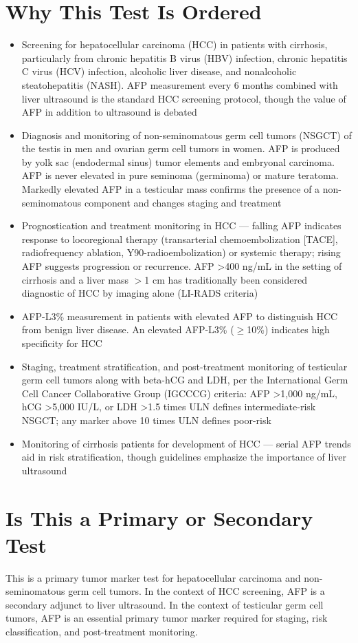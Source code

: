 \section*{Why This Test Is Ordered}
\begin{itemize}
  \item Screening for hepatocellular carcinoma (HCC) in patients with cirrhosis, particularly from chronic hepatitis B virus (HBV) infection, chronic hepatitis C virus (HCV) infection, alcoholic liver disease, and nonalcoholic steatohepatitis (NASH). AFP measurement every 6 months combined with liver ultrasound is the standard HCC screening protocol, though the value of AFP in addition to ultrasound is debated
  \item Diagnosis and monitoring of non-seminomatous germ cell tumors (NSGCT) of the testis in men and ovarian germ cell tumors in women. AFP is produced by yolk sac (endodermal sinus) tumor elements and embryonal carcinoma. AFP is never elevated in pure seminoma (germinoma) or mature teratoma. Markedly elevated AFP in a testicular mass confirms the presence of a non-seminomatous component and changes staging and treatment
  \item Prognostication and treatment monitoring in HCC --- falling AFP indicates response to locoregional therapy (transarterial chemoembolization [TACE], radiofrequency ablation, Y90-radioembolization) or systemic therapy; rising AFP suggests progression or recurrence. AFP >400 ng/mL in the setting of cirrhosis and a liver mass $>$1 cm has traditionally been considered diagnostic of HCC by imaging alone (LI-RADS criteria)
  \item AFP-L3\% measurement in patients with elevated AFP to distinguish HCC from benign liver disease. An elevated AFP-L3\% ($\geq$10\%) indicates high specificity for HCC
  \item Staging, treatment stratification, and post-treatment monitoring of testicular germ cell tumors along with beta-hCG and LDH, per the International Germ Cell Cancer Collaborative Group (IGCCCG) criteria: AFP >1,000 ng/mL, hCG >5,000 IU/L, or LDH >1.5 times ULN defines intermediate-risk NSGCT; any marker above 10 times ULN defines poor-risk
  \item Monitoring of cirrhosis patients for development of HCC --- serial AFP trends aid in risk stratification, though guidelines emphasize the importance of liver ultrasound
\end{itemize}

\section*{Is This a Primary or Secondary Test}
This is a primary tumor marker test for hepatocellular carcinoma and non-seminomatous germ cell tumors. In the context of HCC screening, AFP is a secondary adjunct to liver ultrasound. In the context of testicular germ cell tumors, AFP is an essential primary tumor marker required for staging, risk classification, and post-treatment monitoring.


